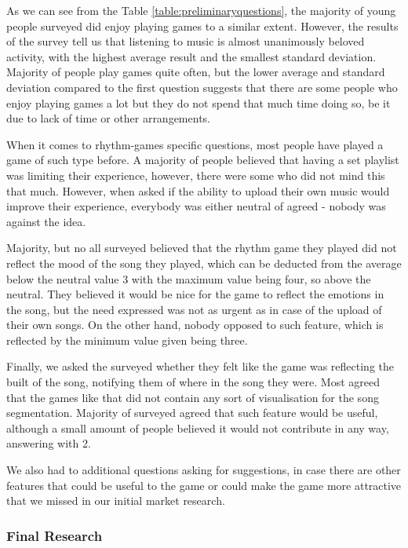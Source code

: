 As we can see from the Table \ref{table:preliminaryquestions}, the majority of young people surveyed did enjoy playing games to a similar extent. However, the results of the survey tell us that listening to music is almost unanimously beloved activity, with the highest average result and the smallest standard deviation. 
Majority of people play games quite often, but the lower average and standard deviation compared to the first question suggests that there are some people who enjoy playing games a lot but they do not spend that much time doing so, be it due to lack of time or other arrangements. 

When it comes to rhythm-games specific questions, most people have played a game of such type before. A majority of people believed that having a set playlist was limiting their experience, however, there were some who did not mind this that much. However, when asked if the ability to upload their own music would improve their experience, everybody was either neutral of agreed - nobody was against the idea. 

Majority, but no all surveyed believed that the rhythm game they played did not reflect the mood of the song they played, which can be deducted from the average below the neutral value 3 with the maximum value being four, so above the neutral. They believed it would be nice for the game to reflect the emotions in the song, but the need expressed was not as urgent as in case of the upload of their own songs. On the other hand, nobody opposed to such feature, which is reflected by the minimum value given being three.

Finally, we asked the surveyed whether they felt like the game was reflecting the built of the song, notifying them of where in the song they were. Most agreed that the games like that did not contain any sort of visualisation for the song segmentation. Majority of surveyed agreed that such feature would be useful, although a small amount of people believed it would not contribute in any way, answering with 2.

We also had to additional questions asking for suggestions, in case there are other features that could be useful to the game or could make the game more attractive that we missed in our initial market research. 

\subsubsection*{Final Research}

